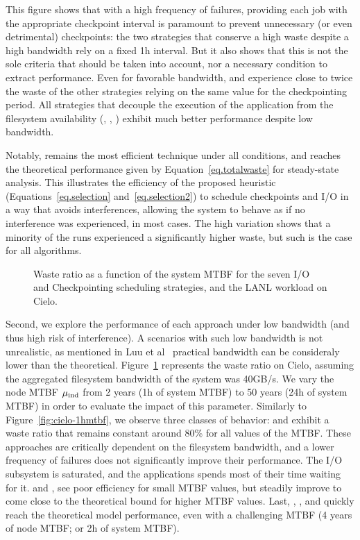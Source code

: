 This figure shows that with a high frequency of failures, providing each job
with the appropriate checkpoint interval is paramount to prevent unnecessary (or
even detrimental) checkpoints: the two strategies that conserve a high waste
despite a high bandwidth rely on a fixed 1h interval. But it also shows that
this is not the sole criteria that should be taken into account, nor a necessary
condition to extract performance. Even for favorable bandwidth, \propdaly and
\bfifodaly experience close to twice the waste of the other strategies relying
on the same value for the checkpointing period. All strategies that decouple the
execution of the application from the filesystem availability (\fifodaly,
\fifofixed, \cooperative) exhibit much better performance despite low bandwidth.

Notably, \cooperative remains the most efficient technique under all
conditions, and reaches the theoretical performance given by
Equation~\eqref{eq.totalwaste} for steady-state analysis. This
illustrates the efficiency of the proposed heuristic
(Equations~\eqref{eq.selection} and~\eqref{eq.selection2}) to schedule
checkpoints and I/O in a way that avoids interferences, allowing the
system to behave as if no interference was experienced, in most
cases. The high variation shows that a minority of the runs
experienced a significantly higher waste, but such is the case for
all algorithms.

\begin{figure}
  \begin{center}
    \resizebox{\linewidth}{!}{}
  \end{center}
  \caption{Waste ratio as a function of the system MTBF for the
    seven I/O and Checkpointing scheduling strategies, and the LANL workload on
    Cielo. \label{fig:cielo-40gbs}}
\end{figure}

Second, we explore the performance of each approach under low bandwidth (and
thus high risk of interference). A scenarios with such low bandwidth is not
unrealistic, as mentioned in Luu et al~\cite{Luu:2015:Multiplatform} practical
bandwidth can be consideraly lower than the theoretical.
Figure~\ref{fig:cielo-40gbs} represents the waste ratio on Cielo, assuming the
aggregated filesystem bandwidth of the system was 40GB/s. We vary the node MTBF
$\mu_{\text{ind}}$ from 2 years (1h of system MTBF) to 50 years (24h of system MTBF) in
order to evaluate the impact of this parameter. Similarly to
Figure~\ref{fig:cielo-1hmtbf}, we observe three classes of behavior: \propfixed
and \bfifofixed exhibit a waste ratio that remains constant around 80\% for all
values of the MTBF. These approaches are critically dependent on the filesystem
bandwidth, and a lower frequency of failures does not significantly improve
their performance. The I/O subsystem is saturated, and the applications spends
most of their time waiting for it.
%
\propdaly and \bfifodaly, see poor efficiency for small MTBF values, but
steadily improve to come close to the theoretical bound for higher MTBF values.
Last, \fifodaly, \fifofixed, and \cooperative quickly reach the theoretical
model performance, even with a challenging MTBF (4 years of node MTBF; or 2h of
system MTBF).

